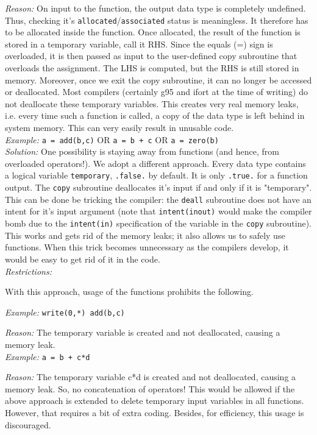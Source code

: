 \documentclass[12pt]{article}
\begin{document}
\emph{Reason:} On input to the function, the output data type is
completely undefined. Thus, checking it's
\verb"allocated"/\verb"associated" status is meaningless. It
therefore has to be allocated inside the function. Once allocated,
the result of the function is stored in a temporary variable, call
it RHS. Since the equals (=) sign is overloaded, it is then passed
as input to the user-defined copy subroutine that overloads the
assignment. The LHS is computed, but the RHS is still stored in
memory. Moreover, once we exit the copy subroutine, it can no longer
be accessed or deallocated. Most compilers (certainly g95 and ifort
at the time of writing) do not deallocate these temporary variables.
This creates very real memory leaks, i.e. every time such a function
is called, a copy of the data type is left behind in system memory.
This can very easily result in unusable code.\\

\emph{Example:} \verb"a = add(b,c)" OR \verb"a = b + c" OR \verb"a = zero(b)"\\

\emph{Solution:} One possibility is staying away from functions (and
hence, from overloaded operators!). We adopt a different approach.
Every data type contains a logical variable \verb"temporary",
\verb".false." by default. It is only \verb".true." for a function
output. The \verb"copy" subroutine deallocates it's input if and
only if it is "temporary". This can be done be tricking the
compiler: the \verb"deall" subroutine does not have an intent for
it's input argument (note that \verb"intent(inout)" would make the
compiler bomb due to the \verb"intent(in)" specification of the
variable in the \verb"copy" subroutine). This works and gets rid of
the memory leaks; it also allows us to safely use functions. When
this trick becomes unnecessary as the compilers develop, it would be
easy to get rid of
it in the code.\\

\emph{Restrictions:}

With this approach, usage of the functions prohibits the following.

\emph{Example:} \verb"write(0,*) add(b,c)"

\emph{Reason:} The temporary variable is created and not
deallocated, causing a memory leak.\\

\emph{Example:} \verb"a = b + c*d"

\emph{Reason:} The temporary variable c*d is created and not
deallocated, causing a memory leak. So, no concatenation of
operators! This would be allowed if the above approach is extended
to delete temporary input variables in all functions. However, that
requires a bit of extra
coding. Besides, for efficiency, this usage is discouraged.\\
\end{document}
